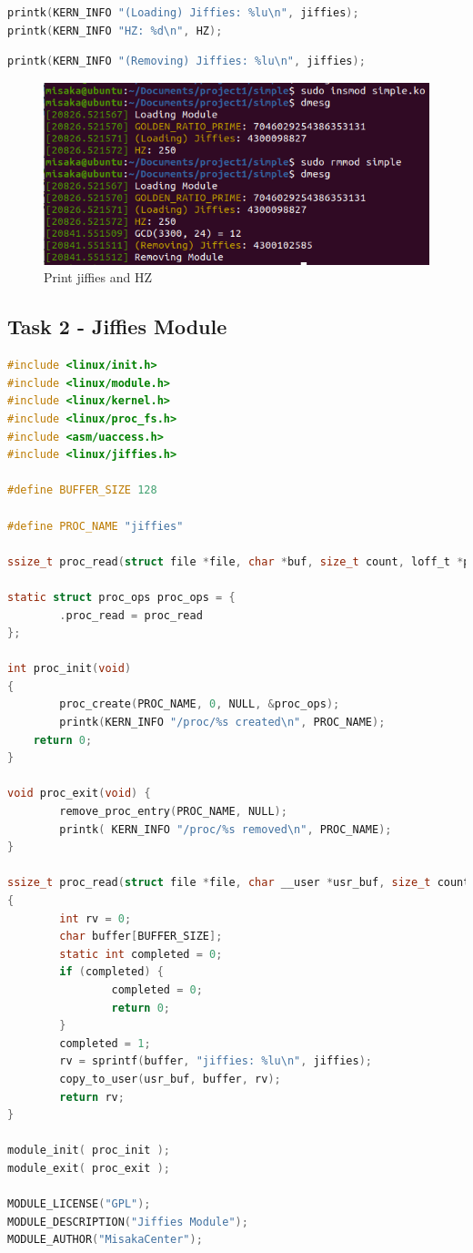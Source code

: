\documentclass[UTF8,10pt,a4paper]{article}
\theoremstyle{Problem}
\theoremstyle{Solution}
\begin{document}
\begin{lstlisting}[language = c]
printk(KERN_INFO "(Loading) Jiffies: %lu\n", jiffies);
printk(KERN_INFO "HZ: %d\n", HZ);
\end{lstlisting}

\begin{lstlisting}[language = c]
printk(KERN_INFO "(Removing) Jiffies: %lu\n", jiffies);
\end{lstlisting}

\begin{figure}[H]
    \centering
    \includegraphics[width=380pt]{simple2.png}
    \caption{Print jiffies and HZ}
    \label{7}
\end{figure}

\subsection{Task 2 - Jiffies Module}



\begin{lstlisting}[language = c]
#include <linux/init.h>
#include <linux/module.h>
#include <linux/kernel.h>
#include <linux/proc_fs.h>
#include <asm/uaccess.h>
#include <linux/jiffies.h>

#define BUFFER_SIZE 128

#define PROC_NAME "jiffies"

ssize_t proc_read(struct file *file, char *buf, size_t count, loff_t *pos);

static struct proc_ops proc_ops = {
        .proc_read = proc_read
};

int proc_init(void)
{
        proc_create(PROC_NAME, 0, NULL, &proc_ops);
        printk(KERN_INFO "/proc/%s created\n", PROC_NAME);
	return 0;
}

void proc_exit(void) {
        remove_proc_entry(PROC_NAME, NULL);
        printk( KERN_INFO "/proc/%s removed\n", PROC_NAME);
}

ssize_t proc_read(struct file *file, char __user *usr_buf, size_t count, loff_t *pos)
{
        int rv = 0;
        char buffer[BUFFER_SIZE];
        static int completed = 0;
        if (completed) {
                completed = 0;
                return 0;
        }
        completed = 1;
        rv = sprintf(buffer, "jiffies: %lu\n", jiffies);
        copy_to_user(usr_buf, buffer, rv);
        return rv;
}

module_init( proc_init );
module_exit( proc_exit );

MODULE_LICENSE("GPL");
MODULE_DESCRIPTION("Jiffies Module");
MODULE_AUTHOR("MisakaCenter");
\end{lstlisting}
\end{document}
